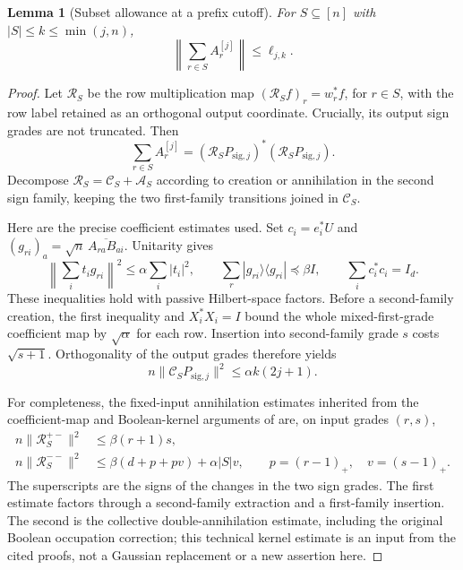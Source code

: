 \documentclass[11pt,a4paper]{article}
\newtheorem{lemma}[theorem]{Lemma}
\theoremstyle{definition}\newtheorem{definition}[theorem]{Definition}
\theoremstyle{remark}\newtheorem{remark}[theorem]{Remark}
\newcommand{\norm}[1]{\lVert#1\rVert}\newcommand{\ip}[2]{\langle#1,#2\rangle}
\numberwithin{equation}{section}
\begin{document}
\begin{lemma}[Subset allowance at a prefix cutoff]
\label{lem:srht-prefix-subsets}
For $S\subseteq[n]$ with $|S|\le k\le\min(j,n)$,
\begin{equation}
 \left\|\sum_{r\in S}A_r^{[j]}\right\|\le\ell_{j,k}.
 \label{eq:srht-prefix-subsets}
\end{equation}
\end{lemma}
\begin{proof}
Let $\mathcal R_S$ be the row multiplication map
$(\mathcal R_Sf)_r=w_r^*f$, for $r\in S$, with the row label retained as
an orthogonal output coordinate. Crucially, its output sign grades are not
truncated. Then
\[
 \sum_{r\in S}A_r^{[j]}
   =(\mathcal R_SP_{\mathrm{sig},j})^*
     (\mathcal R_SP_{\mathrm{sig},j}).
\]
Decompose $\mathcal R_S=\mathcal C_S+\mathcal A_S$ according to creation
or annihilation in the second sign family, keeping the two first-family
transitions joined in $\mathcal C_S$.

Here are the precise coefficient estimates used. Set $c_i=e_i^*U$ and
$(g_{ri})_a=\sqrt n\,\overline{A_{ra}B_{ai}}$. Unitarity gives
\[
 \left\|\sum_i t_i g_{ri}\right\|^2\le\alpha\sum_i|t_i|^2,
 \qquad
 \sum_r|g_{ri}\rangle\langle g_{ri}|\preceq\beta I,
 \qquad \sum_i c_i^*c_i=I_d.
\]
These inequalities hold with passive Hilbert-space factors. Before a
second-family creation, the first inequality and $X_i^*X_i=I$ bound the
whole mixed-first-grade coefficient map by $\sqrt\alpha$ for each row.
Insertion into second-family grade $s$ costs $\sqrt{s+1}$. Orthogonality
of the output grades therefore yields
\begin{equation}
 n\norm{\mathcal C_SP_{\mathrm{sig},j}}^2
       \le\alpha k(2j+1).
 \label{eq:srht-creation-row}
\end{equation}

For completeness, the fixed-input annihilation estimates inherited from
the coefficient-map and Boolean-kernel arguments of
\cite{GradedSource,SRHTSource} are, on input grades $(r,s)$,
\begin{align*}
 n\norm{\mathcal R_S^{+-}}^2&\le\beta(r+1)s,\\
 n\norm{\mathcal R_S^{--}}^2
      &\le\beta(d+p+pv)+\alpha |S|v,
      \qquad p=(r-1)_+,\quad v=(s-1)_+.
\end{align*}
The superscripts are the signs of the changes in the two sign grades.
The first estimate factors through a second-family extraction and a
first-family insertion. The second is the collective double-annihilation
estimate, including the original Boolean occupation correction; this
technical kernel estimate is an input from the cited proofs, not a Gaussian
replacement or a new assertion here.


\end{proof}
\end{document}
